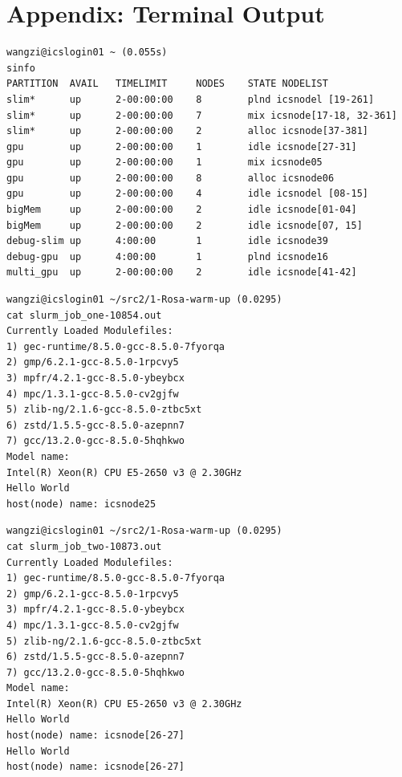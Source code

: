 \documentclass[unicode,11pt,a4paper,oneside,numbers=endperiod,openany]{scrartcl}
\begin{document}
\section{Appendix: Terminal Output}
\begin{lstlisting}[style=mystyle, language=MyBash,caption={Basic information of nodes}]
wangzi@icslogin01 ~ (0.055s)
sinfo
PARTITION  AVAIL   TIMELIMIT     NODES    STATE NODELIST
slim*      up      2-00:00:00    8        plnd icsnodel [19-261]
slim*      up      2-00:00:00    7        mix icsnode[17-18, 32-361]
slim*      up      2-00:00:00    2        alloc icsnode[37-381]
gpu        up      2-00:00:00    1        idle icsnode[27-31]
gpu        up      2-00:00:00    1        mix icsnode05
gpu        up      2-00:00:00    8        alloc icsnode06
gpu        up      2-00:00:00    4        idle icsnodel [08-15]
bigMem     up      2-00:00:00    2        idle icsnode[01-04]
bigMem     up      2-00:00:00    2        idle icsnode[07, 15]
debug-slim up      4:00:00       1        idle icsnode39
debug-gpu  up      4:00:00       1        plnd icsnode16
multi_gpu  up      2-00:00:00    2        idle icsnode[41-42]
\end{lstlisting}

\begin{lstlisting}[language=MyBatch, style=mystyle, caption={The Result of batch script of one node}]
wangzi@icslogin01 ~/src2/1-Rosa-warm-up (0.0295)
cat slurm_job_one-10854.out
Currently Loaded Modulefiles:
1) gec-runtime/8.5.0-gcc-8.5.0-7fyorqa
2) gmp/6.2.1-gcc-8.5.0-1rpcvy5
3) mpfr/4.2.1-gcc-8.5.0-ybeybcx
4) mpc/1.3.1-gcc-8.5.0-cv2gjfw
5) zlib-ng/2.1.6-gcc-8.5.0-ztbc5xt
6) zstd/1.5.5-gcc-8.5.0-azepnn7
7) gcc/13.2.0-gcc-8.5.0-5hqhkwo
Model name:
Intel(R) Xeon(R) CPU E5-2650 v3 @ 2.30GHz
Hello World
host(node) name: icsnode25
\end{lstlisting}

\begin{lstlisting}[style=mystyle, caption={The Result of batch script of two node}]
wangzi@icslogin01 ~/src2/1-Rosa-warm-up (0.0295)
cat slurm_job_two-10873.out
Currently Loaded Modulefiles:
1) gec-runtime/8.5.0-gcc-8.5.0-7fyorqa
2) gmp/6.2.1-gcc-8.5.0-1rpcvy5
3) mpfr/4.2.1-gcc-8.5.0-ybeybcx
4) mpc/1.3.1-gcc-8.5.0-cv2gjfw
5) zlib-ng/2.1.6-gcc-8.5.0-ztbc5xt
6) zstd/1.5.5-gcc-8.5.0-azepnn7
7) gcc/13.2.0-gcc-8.5.0-5hqhkwo
Model name:
Intel(R) Xeon(R) CPU E5-2650 v3 @ 2.30GHz
Hello World
host(node) name: icsnode[26-27]
Hello World
host(node) name: icsnode[26-27]
\end{lstlisting}
\end{document}
